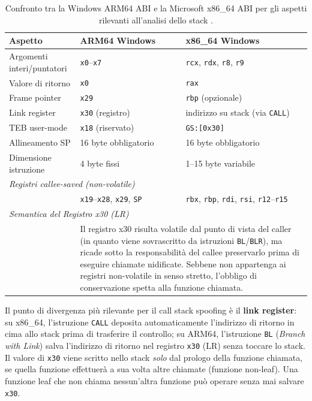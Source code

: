 \begin{table}[H]
\centering
\begin{tabular}{lll}
\toprule
Aspetto & ARM64 Windows & x86\_64 Windows \\
\midrule
Argomenti interi/puntatori & \texttt{x0}--\texttt{x7} & \texttt{rcx}, \texttt{rdx}, \texttt{r8}, \texttt{r9} \\
Valore di ritorno           & \texttt{x0}              & \texttt{rax} \\
Frame pointer               & \texttt{x29}             & \texttt{rbp} (opzionale) \\
Link register               & \texttt{x30} (registro)  & indirizzo su stack (via \texttt{CALL}) \\
TEB user-mode               & \texttt{x18} (riservato) & \texttt{GS:[0x30]} \\
Allineamento SP             & 16 byte obbligatorio     & 16 byte obbligatorio \\
Dimensione istruzione       & 4 byte fissi             & 1--15 byte variabile \\
\midrule
\multicolumn{3}{l}{\emph{Registri callee-saved (non-volatile)}} \\
\midrule
                            & \texttt{x19}--\texttt{x28}, \texttt{x29}, \texttt{SP} &
                              \texttt{rbx}, \texttt{rbp}, \texttt{rdi}, \texttt{rsi}, \texttt{r12}--\texttt{r15} \\
\midrule
\multicolumn{3}{l}{\emph{Semantica del Registro x30 (LR)}} \\
\midrule
                            & \multicolumn{2}{p{10cm}}{Il registro x30 risulta volatile dal punto di vista del caller 
                              (in quanto viene sovrascritto da istruzioni \texttt{BL}/\texttt{BLR}), ma ricade sotto la 
                              responsabilità del callee preservarlo prima di eseguire chiamate nidificate. Sebbene non appartenga 
                              ai registri non-volatile in senso stretto, l'obbligo di conservazione spetta alla funzione chiamata.} \\
\bottomrule
\end{tabular}
\caption{Confronto tra la Windows ARM64 ABI e la Microsoft x86\_64 ABI
         per gli aspetti rilevanti all'analisi dello stack \cite{msarm64abi}.}
\label{tab:abi-compare}
\end{table}

Il punto di divergenza più rilevante per il call stack spoofing è il
\textbf{link register}: su x86\_64, l'istruzione \texttt{CALL} deposita
automaticamente l'indirizzo di ritorno in cima allo stack prima di trasferire
il controllo; su ARM64, l'istruzione \texttt{BL} (\emph{Branch with Link})
salva l'indirizzo di ritorno nel registro \texttt{x30} (LR) senza toccare
lo stack. Il valore di \texttt{x30} viene scritto nello stack \emph{solo} dal
prologo della funzione chiamata, se quella funzione effettuerà a sua volta
altre chiamate (funzione non-leaf). Una funzione leaf che non chiama nessun'altra
funzione può operare senza mai salvare \texttt{x30}.

